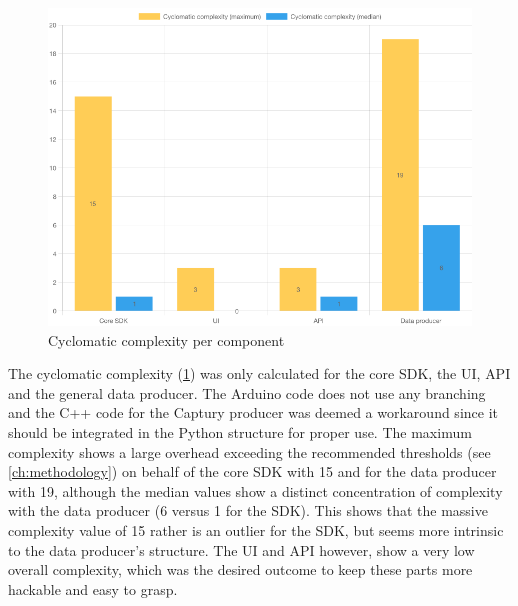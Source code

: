 \begin{figure}[h]
\centering
\includegraphics[scale=0.5]{04_Artefakte/01_Abbildungen/code-stats-complexity}
\caption[Cyclomatic complexity]{Cyclomatic complexity per component\protect}
\label{fig:cyclomaticComplexity}
\end{figure}

The cyclomatic complexity (\ref{fig:cyclomaticComplexity}) was only calculated for the core \ac{SDK}, the \ac{UI}, \ac{API} and the general data producer. The Arduino code does not use any branching and the C++ code for the Captury producer was deemed a workaround since it should be integrated in the Python structure for proper use. The maximum complexity shows a large overhead exceeding the recommended thresholds (see \autoref{ch:methodology}) on behalf of the core \ac{SDK} with 15 and for the data producer with 19, although the median values show a distinct concentration of complexity with the data producer (6 versus 1 for the \ac{SDK}). This shows that the massive complexity value of 15 rather is an outlier for the \ac{SDK}, but seems more intrinsic to the data producer's structure. The \ac{UI} and \ac{API} however, show a very low overall complexity, which was the desired outcome to keep these parts more hackable and easy to grasp.

